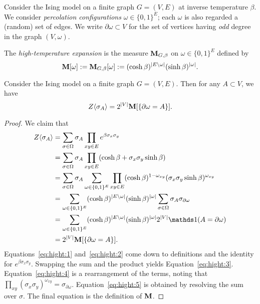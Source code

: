 \begin{definition}
    Consider the Ising model on a finite graph $G=(V,E)$ at inverse temperature $\beta$.
    We consider \emph{percolation configurations} $\omega\in\{0,1\}^E$;
    each $\omega$ is also regarded a (random) set of edges.
    We write $\partial\omega\subset V$ for the set of vertices having
    \emph{odd} degree in the graph $(V,\omega)$.

    The \emph{high-temperature expansion} is the measure $\mathbf{M}_{G,\beta}$
    on $\omega\in\{0,1\}^E$ defined by
    \[
        \mathbf{M}[\omega]:=\mathbf{M}_{G,\beta}[\omega]:=(\cosh\beta)^{|E\setminus\omega|}(\sinh\beta)^{|\omega|}.
    \]
\end{definition}

\begin{theorem}
    Consider the Ising model on a finite graph $G=(V,E)$.
    Then for any $A\subset V$, we have
    \[
        Z\langle\sigma_A\rangle=2^{|V|}\mathbf{M}[\{\partial\omega=A\}].
    \]
\end{theorem}

\begin{proof}
    We claim that
    \begin{align}
        \label{eq:hight:1}
        Z\langle\sigma_A\rangle
        &=
        \sum_{\sigma\in\Omega}
        \sigma_A
        \prod_{xy\in E}
        e^{\beta\sigma_x\sigma_y}
        \\
        \label{eq:hight:2}
        &=
        \sum_{\sigma\in\Omega}
        \sigma_A
        \prod_{xy\in E}
        (\cosh\beta+\sigma_x\sigma_y\sinh\beta)
        \\
        \label{eq:hight:3}
        &=
        \sum_{\sigma\in\Omega}
        \sigma_A
        \sum_{\omega\in\{0,1\}^E}
        \prod_{xy\in E}
        (\cosh\beta)^{1-\omega_{xy}}(\sigma_x\sigma_y\sinh\beta)^{\omega_{xy}}
        \\
        \label{eq:hight:4}
        &=
        \sum_{\omega\in\{0,1\}^E}
        (\cosh\beta)^{|E\setminus\omega|}(\sinh\beta)^{|\omega|}
        \sum_{\sigma\in\Omega}
        \sigma_A
        \sigma_{\partial\omega}
        \\
        \label{eq:hight:5}
        &=
        \sum_{\omega\in\{0,1\}^E}
        (\cosh\beta)^{|E\setminus\omega|}(\sinh\beta)^{|\omega|}
        2^{|V|}\true{A=\partial\omega}
        \\
        &=
        2^{|V|}\bfM[\{\partial\omega=A\}].
    \end{align}
    Equations~\eqref{eq:hight:1} and~\eqref{eq:hight:2}
    come down to definitions
    and the identity for $e^{\beta\sigma_x\sigma_y}$.
    Swapping the sum and the product yields Equation~\eqref{eq:hight:3}.
    Equation~\eqref{eq:hight:4} is a rearrangement of the terms,
    noting that $\prod_{xy}(\sigma_x\sigma_y)^{\omega_{xy}}=\sigma_{\partial\omega}$.
    Equation~\eqref{eq:hight:5} is obtained by resolving the sum over $\sigma$.
    The final equation is the definition of $\mathbf{M}$.
\end{proof}

